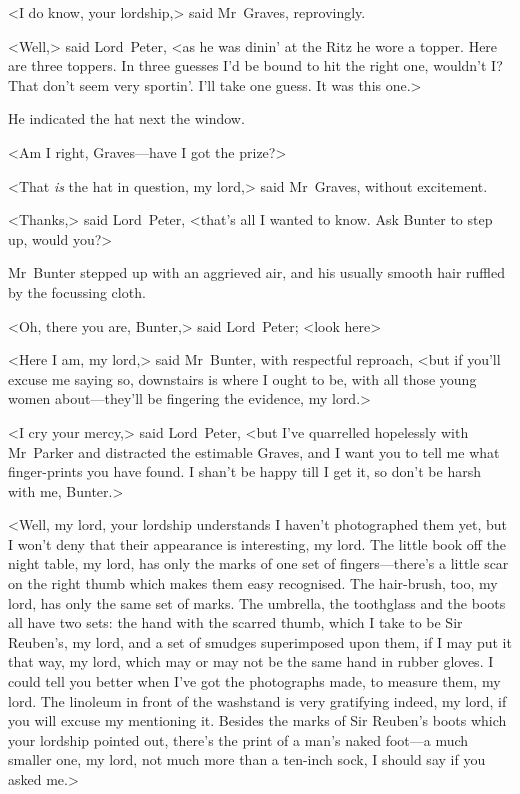 <I do know, your lordship,> said Mr~Graves, reprovingly.

<Well,> said Lord~Peter, <as he was dinin' at the Ritz he wore a topper. Here are three toppers. In three guesses I'd be bound to hit the right one, wouldn't I\@? That don't seem very sportin'. I'll take one guess. It was this one.>

He indicated the hat next the window.

<Am I right, Graves—have I got the prize?>

<That \emph{is} the hat in question, my lord,> said Mr~Graves, without excitement.

<Thanks,> said Lord~Peter, <that's all I wanted to know. Ask Bunter to step up, would you?>

Mr~Bunter stepped up with an aggrieved air, and his usually smooth hair ruffled by the focussing cloth.

<Oh, there you are, Bunter,> said Lord~Peter; <look here\longdash>

<Here I am, my lord,> said Mr~Bunter, with respectful reproach, <but if you'll excuse me saying so, downstairs is where I ought to be, with all those young women about—they'll be fingering the evidence, my lord.>

<I cry your mercy,> said Lord~Peter, <but I've quarrelled hopelessly with Mr~Parker and distracted the estimable Graves, and I want you to tell me what finger-prints you have found. I shan't be happy till I get it, so don't be harsh with me, Bunter.>

<Well, my lord, your lordship understands I haven't photographed them yet, but I won't deny that their appearance is interesting, my lord. The little book off the night table, my lord, has only the marks of one set of fingers—there's a little scar on the right thumb which makes them easy recognised. The hair-brush, too, my lord, has only the same set of marks. The umbrella, the toothglass and the boots all have two sets: the hand with the scarred thumb, which I take to be Sir Reuben's, my lord, and a set of smudges superimposed upon them, if I may put it that way, my lord, which may or may not be the same hand in rubber gloves. I could tell you better when I've got the photographs made, to measure them, my lord. The linoleum in front of the washstand is very gratifying indeed, my lord, if you will excuse my mentioning it. Besides the marks of Sir Reuben's boots which your lordship pointed out, there's the print of a man's naked foot—a much smaller one, my lord, not much more than a ten-inch sock, I should say if you asked me.>

